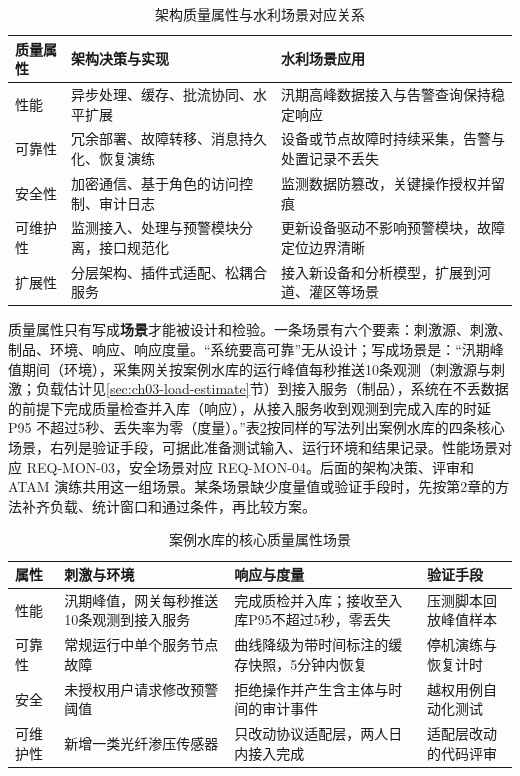 \begin{table}[htbp]
\centering
\caption{架构质量属性与水利场景对应关系}\label{tab:quality-attributes}
\begin{tabular}{p{1.8cm}p{5.0cm}p{5.5cm}}
\toprule
质量属性 & 架构决策与实现 & 水利场景应用 \\
\midrule
性能 & 异步处理、缓存、批流协同、水平扩展 & 汛期高峰数据接入与告警查询保持稳定响应 \\
可靠性 & 冗余部署、故障转移、消息持久化、恢复演练 & 设备或节点故障时持续采集，告警与处置记录不丢失 \\
安全性 & 加密通信、基于角色的访问控制、审计日志 & 监测数据防篡改，关键操作授权并留痕 \\
可维护性 & 监测接入、处理与预警模块分离，接口规范化 & 更新设备驱动不影响预警模块，故障定位边界清晰 \\
扩展性 & 分层架构、插件式适配、松耦合服务 & 接入新设备和分析模型，扩展到河道、灌区等场景 \\
\bottomrule
\end{tabular}
\end{table}

质量属性只有写成\textbf{场景}才能被设计和检验。一条场景有六个要素：刺激源、刺激、制品、环境、响应、响应度量。“系统要高可靠”无从设计；写成场景是：“汛期峰值期间（环境），采集网关按案例水库的运行峰值每秒推送10条观测（刺激源与刺激；负载估计见\ref{sec:ch03-load-estimate}节）到接入服务（制品），系统在不丢数据的前提下完成质量检查并入库（响应），从接入服务收到观测到完成入库的时延 P95 不超过5秒、丢失率为零（度量）。”表\ref{tab:ch03-quality-scenarios}按同样的写法列出案例水库的四条核心场景，右列是验证手段，可据此准备测试输入、运行环境和结果记录。性能场景对应 REQ-MON-03，安全场景对应 REQ-MON-04。后面的架构决策、评审和 ATAM 演练共用这一组场景。某条场景缺少度量值或验证手段时，先按第2章的方法补齐负载、统计窗口和通过条件，再比较方案。

\begin{table}[htbp]
\centering
\caption{案例水库的核心质量属性场景}
\label{tab:ch03-quality-scenarios}
\begin{tabular}{p{1.6cm}p{4.6cm}p{3.6cm}p{3.2cm}}
\toprule
属性 & 刺激与环境 & 响应与度量 & 验证手段 \\
\midrule
性能 & 汛期峰值，网关每秒推送10条观测到接入服务 & 完成质检并入库；接收至入库P95不超过5秒，零丢失 & 压测脚本回放峰值样本 \\
可靠性 & 常规运行中单个服务节点故障 & 曲线降级为带时间标注的缓存快照，5分钟内恢复 & 停机演练与恢复计时 \\
安全 & 未授权用户请求修改预警阈值 & 拒绝操作并产生含主体与时间的审计事件 & 越权用例自动化测试 \\
可维护性 & 新增一类光纤渗压传感器 & 只改动协议适配层，两人日内接入完成 & 适配层改动的代码评审 \\
\bottomrule
\end{tabular}
\end{table}

